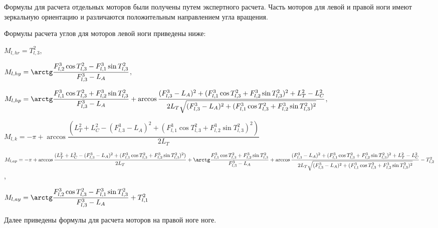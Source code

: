 Формулы для расчета отдельных моторов были получены путем экспертного расчета. Часть моторов для левой и правой ноги имеют зеркальную ориентацию и различаются положительным направлением угла вращения.

Формулы расчета углов для моторов левой ноги приведены ниже:

\begin{center}
$M_{l,hr} = T^{2}_{l,3}$,

$M_{l,hy} = \arctg \dfrac{F^{3}_{l,2} \cos T^{2}_{l,3} - F^{3}_{l,1} \sin T^{2}_{l,3}}{F^{3}_{l,3} - L_{A}}$,

$M_{l,hp} = \arctg \dfrac{  F^{3}_{l,1} \cos T^{2}_{l,3} + F^{3}_{l,2} \sin T^{2}_{l,3}  }{  F^{3}_{l,3} - L_{A}  } + \arccos \dfrac{  (F^{3}_{l,3} - L_{A})^{2} + (F^{3}_{l,1} \cos T^{2}_{l,3} + F^{3}_{l,2} \sin T^{2}_{l,3}) ^ {2}  + L_{T}^{2} - L_{C} ^ 2 }{ 2 L_{T} \sqrt{(F^{3}_{l,3} - L_{A})^{2} + (F^{3}_{l,1} \cos T^{2}_{l,3} + F^{3}_{l,2} \sin T^{2}_{l,3}) ^ {2}}}$,

$M_{l,k} = -\pi + \arccos \dfrac{(L_{T} ^ {2} + L_{C} ^ {2} - (F^{3}_{l,3} - L_{A})^{2} + (F^{3}_{l,1} \cos T^{2}_{l,3} + F^{3}_{l,2} \sin T^{2}_{l,3}) ^ {2})} {2 L_{T}} $

$M_{l,ap} = -\pi + \arccos \dfrac{(L_{T} ^ {2} + L_{C} ^ {2} - (F^{3}_{l,3} - L_{A})^{2} + (F^{3}_{l,1} \cos T^{2}_{l,3} + F^{3}_{l,2} \sin T^{2}_{l,3}) ^ {2})} {2 L_{T}} + \arctg \dfrac{  F^{3}_{l,1} \cos T^{2}_{l,3} + F^{3}_{l,2} \sin T^{2}_{l,3}  }{  F^{3}_{l,3} - L_{A}  } + \arccos \dfrac{  (F^{3}_{l,3} - L_{A})^{2} + (F^{3}_{l,1} \cos T^{2}_{l,3} + F^{3}_{l,2} \sin T^{2}_{l,3}) ^ {2}  + L_{T}^{2} - L_{C} ^ 2 }{ 2 L_{T} \sqrt{(F^{3}_{l,3} - L_{A})^{2} + (F^{3}_{l,1} \cos T^{2}_{l,3} + F^{3}_{l,2} \sin T^{2}_{l,3}) ^ {2}}} - T^{2}_{l,2}$,

$M_{l,ay} = \arctg \dfrac{F^{3}_{l,2} \cos T^{2}_{l,3} - F^{3}_{l,1} \sin T^{2}_{l,3}}{F^{3}_{l,3} - L_{A}} + T^{2}_{l,1}$
\end{center}

Далее приведены формулы для расчета моторов на правой ноге ноге.

